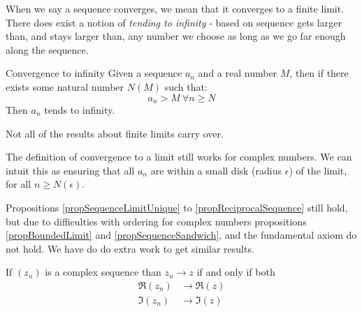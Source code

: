 \documentclass[../Main.tex]{subfiles}
\begin{document}
\begin{remark}
    When we say a sequence converges, we mean that it converges to a finite limit. There does exist a notion of \textit{tending to infinity} - based on sequence gets larger than, and stays larger than, any number we choose as long as we go far enough along the sequence.
\end{remark}
\begin{definition}{Convergence to infinity}
    Given a sequence $a_n$ and a real number $M$, then if there exists some natural number $N(M)$ such that:
    \begin{equation*}
        a_n > M~\forall n \geq N
    \end{equation*}
    Then $a_n$ tends to infinity.
\end{definition}
\begin{warning}
    Not all of the results about finite limits carry over.
\end{warning}
\begin{remark}
    The definition of convergence to a limit still works for complex numbers. We can intuit this as ensuring that all $a_n$ are within a small disk (radius $\epsilon$) of the limit, for all $n \geq N(\epsilon)$.\par
    Propositions \ref{propSequenceLimitUnique} to \ref{propReciprocalSequence} still hold, but due to difficulties with ordering for complex numbers propositions \ref{propBoundedLimit} and \ref{propSequenceSandwich}, and the fundamental axiom do not hold. We have do do extra work to get similar results.
\end{remark}
\begin{lemma}
    If $(z_n)$ is a complex sequence than $z_n \rightarrow z$ if and only if both
    \begin{align*}
        \Re(z_n) &\rightarrow \Re(z) \\
        \Im(z_n) &\rightarrow \Im(z)
    \end{align*}
    \label{lemComplexConvergence}
\end{lemma}
\end{document}
